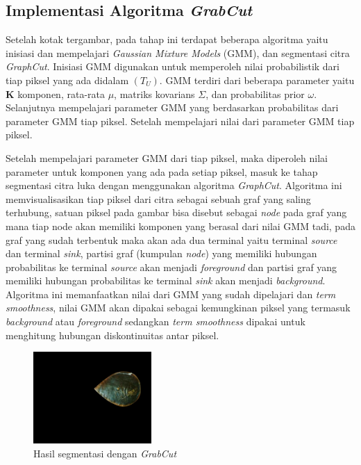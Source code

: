 \subsection{Implementasi Algoritma \emph{GrabCut}}
Setelah kotak tergambar, pada tahap ini terdapat beberapa algoritma yaitu inisiasi 
dan mempelajari \emph{Gaussian Mixture Models} (GMM), dan segmentasi citra \emph{GraphCut}. 
Inisiasi GMM digunakan untuk memperoleh nilai probabilistik dari tiap piksel yang ada
didalam \((T_{U})\). GMM terdiri dari beberapa parameter yaitu \textbf{K} komponen, 
rata-rata \(\mu\), matriks kovarians \(\Sigma\), dan probabilitas prior \(\omega\). 
Selanjutnya mempelajari parameter GMM yang berdasarkan probabilitas dari parameter 
GMM tiap piksel. Setelah mempelajari nilai dari parameter GMM tiap piksel.

Setelah mempelajari parameter GMM dari tiap piksel, maka diperoleh nilai parameter
untuk komponen yang ada pada setiap piksel, masuk ke tahap segmentasi citra luka 
dengan menggunakan algoritma \emph{GraphCut}. Algoritma ini memvisualisasikan tiap piksel 
dari citra sebagai sebuah graf yang saling terhubung, satuan piksel pada gambar bisa
disebut sebagai \emph{node} pada graf yang mana tiap node akan memiliki komponen yang 
berasal dari nilai GMM tadi, pada graf yang sudah terbentuk maka akan ada dua terminal
yaitu terminal \emph{source} dan terminal \emph{sink}, partisi graf (kumpulan \emph{node}) 
yang memiliki hubungan probabilitas ke terminal \emph{source} akan menjadi \emph{foreground}
dan partisi graf yang memiliki hubungan probabilitas ke terminal \emph{sink} akan
menjadi \emph{background}. Algoritma ini memanfaatkan nilai dari GMM yang sudah dipelajari dan \emph{term smoothness}, nilai GMM akan dipakai sebagai
kemungkinan piksel yang termasuk \emph{background} atau \emph{foreground} sedangkan 
\emph{term smoothness} dipakai untuk menghitung hubungan diskontinuitas antar piksel.

\begin{figure}[H]
	\centering{}
	\includegraphics[width=0.4\textwidth]{gambar/res_2.png}
	\caption{Hasil segmentasi dengan \emph{GrabCut}}
  \end{figure}

